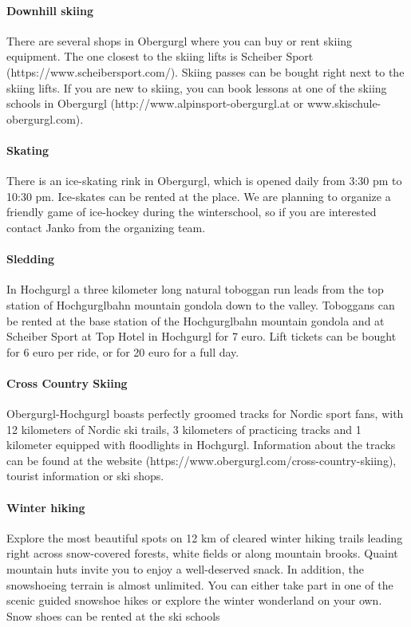 \paragraph{Downhill skiing}
There are several shops in Obergurgl where you can buy or rent skiing equipment. The one closest to the skiing lifts is Scheiber Sport (https://www.scheibersport.com/). Skiing passes can be bought right next to the skiing lifts. If you are new to skiing, you can book lessons at one of the skiing schools in Obergurgl (http://www.alpinsport-obergurgl.at or www.skischule-obergurgl.com). 

\paragraph{Skating}
There is an ice-skating rink in Obergurgl, which is opened daily from 3:30 pm to 10:30 pm. Ice-skates can be rented at the place. We are planning to organize a friendly game of ice-hockey during the winterschool, so if you are interested contact Janko from the organizing team. 

\paragraph{Sledding}
In Hochgurgl a three kilometer long natural toboggan run leads from the top station of Hochgurglbahn mountain gondola down to the valley. Toboggans can be rented at the base station of the Hochgurglbahn mountain gondola and at Scheiber Sport at Top Hotel in Hochgurgl for 7 euro. Lift tickets can be bought for 6 euro per ride, or for 20 euro for a full day. 

\paragraph{Cross Country Skiing}  Obergurgl-Hochgurgl boasts perfectly groomed tracks for Nordic sport fans, with 12 kilometers of Nordic ski trails, 3 kilometers of practicing tracks and 1 kilometer equipped with floodlights in Hochgurgl. Information about the tracks can be found at the website (https://www.obergurgl.com/cross-country-skiing), tourist information or ski shops. 

\paragraph{Winter hiking} Explore the most beautiful spots on 12 km of cleared winter hiking trails leading right across snow-covered forests, white fields or along mountain brooks. Quaint mountain huts invite you to enjoy a well-deserved snack. 
In addition, the snowshoeing terrain is almost unlimited. You can either take part in one of the scenic guided snowshoe hikes or explore the winter wonderland on your own. Snow shoes can be rented at the ski schools 

